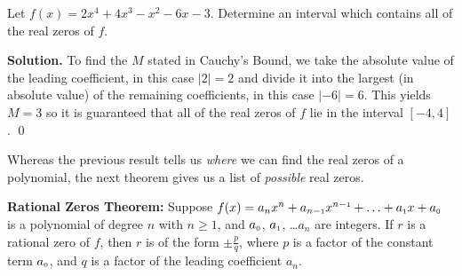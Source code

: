 \begin{ex} \label{CBex} Let $f(x) = 2x^4+4x^3-x^2-6x-3$.  Determine an interval which contains all of the real zeros of $f$.

\smallskip

{\bf Solution.} To find the $M$ stated in Cauchy's Bound, we take the absolute value of the leading coefficient, in this case $|2| = 2$ and divide it into the largest (in absolute value) of the remaining coefficients, in this case $|-6| = 6$.   This yields $M=3$ so it is guaranteed that all of the real zeros of $f$ lie in the interval $[-4,4]$.  \qed

\end{ex}

Whereas the previous result tells us \textit{where} we can find the real zeros of a polynomial, the next theorem gives us a list of \textit{possible} real zeros.

\smallskip

\colorbox{ResultColor}{\bbm

\begin{thm} \label{RZT}\textbf{Rational Zeros Theorem:}  Suppose $f(x) = a_{n} x^{n} + a_{n-\mbox{\tiny$1$}}x^{n-\mbox{\tiny$1$}} + \ldots + a_{\mbox{\tiny$1$}} x + a_{\mbox{\tiny$0$}}$ is a polynomial of degree $n$ with $n \geq 1$, and $a_{\mbox{\tiny$0$}}$, $a_{\mbox{\tiny$1$}}$, \ldots $a_{n}$ are integers.  If $r$ is a rational zero of $f$, then $r$ is of the form $\pm \frac{p}{q}$, where $p$ is a factor of the constant term $a_{\mbox{\tiny$0$}}$, and $q$ is a factor of the leading coefficient $a_{n}$.  
\end{thm}

\ebm}

\smallskip

